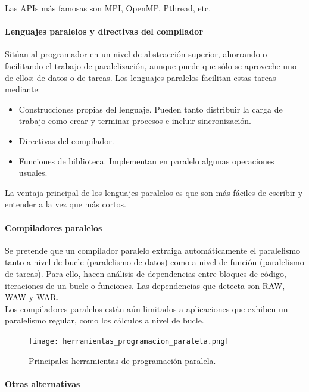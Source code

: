 \documentclass[12pt,spanish]{article}
\begin{document}
Las APIs más famosas son MPI, OpenMP, Pthread, etc.

\paragraph{Lenguajes paralelos y directivas del compilador}

Sitúan al programador en un nivel de abstracción superior, ahorrando o facilitando el trabajo de paralelización, aunque puede que sólo se aproveche uno de ellos: de datos o de tareas. Los lenguajes paralelos facilitan estas tareas mediante:
\begin{itemize}
	\item Construcciones propias del lenguaje. Pueden tanto distribuir la carga de trabajo como crear y terminar procesos e incluir sincronización.
	\item Directivas del compilador.
	\item Funciones de biblioteca. Implementan en paralelo algunas operaciones usuales.
\end{itemize}

La ventaja principal de los lenguajes paralelos es que son más fáciles de escribir y entender a la vez que más cortos.

\paragraph{Compiladores paralelos}

Se pretende que un compilador paralelo extraiga automáticamente el paralelismo tanto a nivel de bucle (paralelismo de datos) como a nivel de función (paralelismo de tareas). Para ello, hacen análisis de dependencias entre bloques de código, iteraciones de un bucle o funciones. Las dependencias que detecta son RAW, WAW y WAR.\\

Los compiladores paralelos están aún limitados a aplicaciones que exhiben un paralelismo regular, como los cálculos a nivel de bucle.

\begin{figure}[H]
\centering
\texttt{[image: herramientas\_programacion\_paralela.png]}
\caption{Principales herramientas de programación paralela.}
\end{figure}

\paragraph{Otras alternativas}
\end{document}
